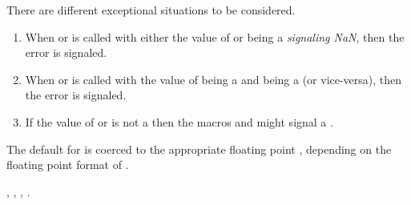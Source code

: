 \documentclass[../Arithmetic-Operations.tex]{subfiles}
\begin{document}
\DExceptional{}

There are different exceptional situations to be considered.

\begin{enumerate}
\item When  or  is called with either the value of
   or  being a \emph{signaling NaN}, then the
   error is signaled.

\item When  or  is called with the value of
   being a  and 
  being a  (or vice-versa), then the
   error is signaled.

\item If the value of  or  is not a \CL{}
   then the macros  and 
  might signal a .
\end{enumerate}

\DNotes{}

The default for  is coerced to the appropriate floating
point , depending on the floating point format of
.

\DSeeAlso{}

\code{+}, \code{-}, , .
\end{document}
